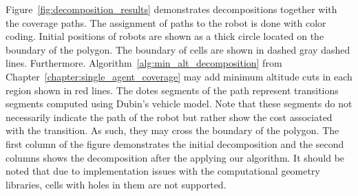 \documentclass[../main.tex]{subfiles}
\begin{document}
Figure~\ref{fig:decomposition_results} demonstrates decompositions together with the coverage paths. The assignment of paths to the robot is done with color coding. Initial positions of robots are shown as a thick circle located on the boundary of the polygon. The boundary of cells are shown in dashed gray dashed lines. Furthermore. Algorithm~\ref{alg:min_alt_decomposition} from Chapter~\ref{chapter:single_agent_coverage} may add minimum altitude cuts in each region shown in red lines. The dotes segments of the path represent transitions segments computed using Dubin's vehicle model. Note that these segments do not necessarily indicate the path of the robot but rather show the cost associated with the transition. As such, they may cross the boundary of the polygon. The first column of the figure demonstrates the initial decomposition and the second columns shows the decomposition after the applying our algorithm. It should be noted that due to implementation issues with the computational geometry libraries, cells with holes in them are not supported. 
\end{document}
